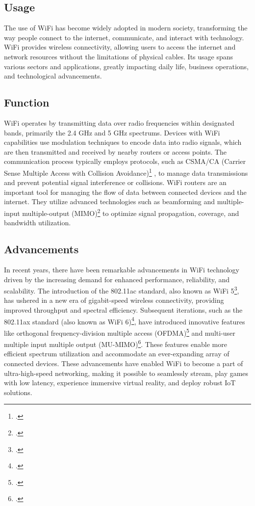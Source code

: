 \subsection{Usage}
The use of WiFi has become widely adopted in modern society, transforming the way people connect to the internet, communicate, and interact with technology. WiFi provides wireless connectivity, allowing users to access the internet and network resources without the limitations of physical cables. Its usage spans various sectors and applications, greatly impacting daily life, business operations, and technological advancements.

\subsection{Function}
WiFi operates by transmitting data over radio frequencies within designated bands, primarily the 2.4 GHz and 5 GHz spectrums. Devices with WiFi capabilities use modulation techniques to encode data into radio signals, which are then transmitted and received by nearby routers or access points. The communication process typically employs protocols, such as CSMA/CA (Carrier Sense Multiple Access with Collision Avoidance)\footcite{csma_ca} , to manage data transmissions and prevent potential signal interference or collisions. WiFi routers are an important tool for managing the flow of data between connected devices and the internet. They utilize advanced technologies such as beamforming and multiple-input multiple-output (MIMO)\footcite{mimo}  to optimize signal propagation, coverage, and bandwidth utilization.

\subsection{Advancements}
In recent years, there have been remarkable advancements in WiFi technology driven by the increasing demand for enhanced performance, reliability, and scalability. The introduction of the 802.11ac standard, also known as WiFi 5\footcite{wifi5}, has ushered in a new era of gigabit-speed wireless connectivity, providing improved throughput and spectral efficiency. Subsequent iterations, such as the 802.11ax standard (also known as WiFi 6)\footcite{wifi6}, have introduced innovative features like orthogonal frequency-division multiple access (OFDMA)\footcite{ofdma} and multi-user multiple input multiple output (MU-MIMO)\footcite{mu_mimo}. These features enable more efficient spectrum utilization and accommodate an ever-expanding array of connected devices. These advancements have enabled WiFi to become a part of ultra-high-speed networking, making it possible to seamlessly stream, play games with low latency, experience immersive virtual reality, and deploy robust IoT solutions.

